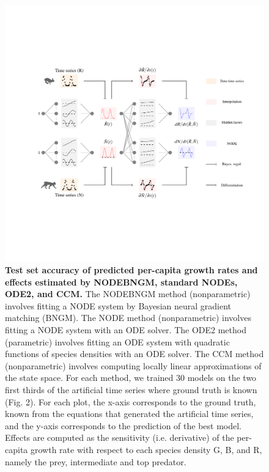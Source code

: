 \documentclass[11pt, oneside]{article}
\begin{document}
\begin{figure}[H]
\includegraphics[width=1\linewidth,page=10]{figures/main.pdf}
\caption{
    \textbf{Test set accuracy of predicted per-capita growth rates and effects estimated by NODEBNGM, standard NODEs, ODE2, and CCM.}
    The NODEBNGM method (nonparametric) involves fitting a NODE system by Bayesian neural gradient matching (BNGM). 
    The NODE method (nonparametric) involves fitting a NODE system with an ODE solver. 
    The ODE2 method (parametric) involves fitting an ODE system with quadratic functions of species densities with an ODE solver. 
    The CCM method (nonparametric) involves computing locally linear approximations of the state space. 
    For each method, we trained 30 models on the two first thirds of the artificial time series where ground truth is known (Fig. 2). 
    For each plot, the x-axis corresponds to the ground truth, known from the equations that generated the artificial time series, and the y-axis corresponds to the prediction of the best model. 
    Effects are computed as the sensitivity (i.e. derivative) of the per-capita growth rate with respect to each species density G, B, and R, namely the prey, intermediate and top predator.
}
\end{figure}
\newpage
\end{document}
